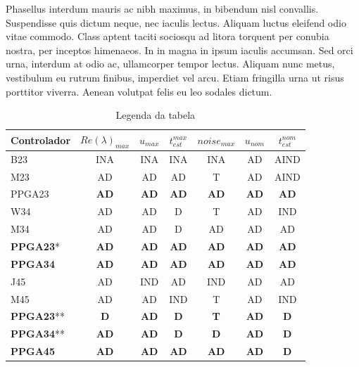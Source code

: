 \documentclass[twoside]{article}
\begin{document}
\begin{multicols}{2}
  Phasellus interdum mauris ac nibh maximus, in bibendum nisl convallis. Suspendisse quis dictum neque, nec iaculis lectus. Aliquam luctus eleifend odio vitae commodo. Class aptent taciti sociosqu ad litora torquent per conubia nostra, per inceptos himenaeos. In in magna in ipsum iaculis accumsan. Sed orci urna, interdum at odio ac, ullamcorper tempor lectus. Aliquam nunc metus, vestibulum eu rutrum finibus, imperdiet vel arcu. Etiam fringilla urna ut risus porttitor viverra. Aenean volutpat felis eu leo sodales dictum.

  \begin{table}[ht]
    \centering
    \caption{Legenda da tabela }
    \label{tabladeseables}
    \begin{tabular}{lcccccc}   \hline
      Controlador       & $Re(\lambda)_{max}$ & $u_{max}$   & $t_{est}^{max}$ & $noise_{max}$ & $u_{nom}$   & $t_{est}^{nom}$ \\ \hline
      B23               & INA                 & INA         & INA             & INA           & AD          & AIND            \\
      M23               & AD                  & AD          & AD              & T             & AD          & AIND            \\
      PPGA23            & \textbf{AD}         & \textbf{AD} & \textbf{AD}     & \textbf{AD}   & \textbf{AD} & \textbf{AD}     \\
      \hline
      W34               & AD                  & AD          & D               & T             & AD          & IND             \\
      M34               & AD                  & AD          & D               & AD            & AD          & AD              \\
      \textbf{PPGA23}*  & \textbf{AD}         & \textbf{AD} & \textbf{AD}     & \textbf{AD}   & \textbf{AD} & \textbf{AD}     \\
      \textbf{PPGA34}   & \textbf{AD}         & \textbf{AD} & \textbf{AD}     & \textbf{AD}   & \textbf{AD} & \textbf{AD}     \\
      \hline
      J45               & AD                  & IND         & AD              & IND           & AD          & AD              \\
      M45               & AD                  & AD          & IND             & T             & AD          & IND             \\
      \textbf{PPGA23}** & \textbf{D}          & \textbf{AD} & \textbf{D}      & \textbf{T}    & \textbf{AD} & \textbf{D}      \\
      \textbf{PPGA34}** & \textbf{AD}         & \textbf{AD} & \textbf{D}      & \textbf{D}    & \textbf{AD} & \textbf{D}      \\
      \textbf{PPGA45}   & \textbf{AD}         & \textbf{AD} & \textbf{AD}     & \textbf{AD}   & \textbf{AD} & \textbf{D}      \\
      \hline
    \end{tabular}
  \end{table}




\end{multicols}
\end{document}
